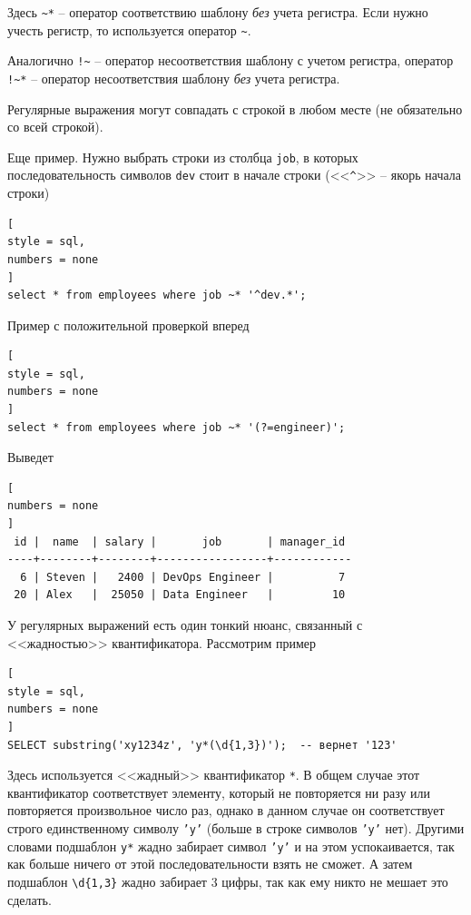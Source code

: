 \documentclass[%
	11pt,
	a4paper,
	utf8,
		]{article}
\begin{document}
Здесь \verb|~*| -- оператор соответствию шаблону \emph{без} учета регистра. Если нужно учесть регистр, то используется оператор \verb|~|.

Аналогично \verb|!~| -- оператор несоответствия шаблону с учетом регистра, оператор \verb|!~*| -- оператор несоответствия шаблону \emph{без} учета регистра.

Регулярные выражения могут совпадать с строкой в любом месте (не обязательно со всей строкой).

Еще пример. Нужно выбрать строки из столбца \texttt{job}, в которых последовательность символов \texttt{dev} стоит в начале строки (<<\verb|^|>> -- якорь начала строки)

\begin{lstlisting}[
style = sql,
numbers = none
]
select * from employees where job ~* '^dev.*';
\end{lstlisting}

Пример с положительной проверкой вперед
\begin{lstlisting}[
style = sql,
numbers = none
]
select * from employees where job ~* '(?=engineer)';
\end{lstlisting}

Выведет
\begin{lstlisting}[
numbers = none
]
 id |  name  | salary |       job       | manager_id
----+--------+--------+-----------------+------------
  6 | Steven |   2400 | DevOps Engineer |          7
 20 | Alex   |  25050 | Data Engineer   |         10
\end{lstlisting}

У регулярных выражений есть один тонкий нюанс, связанный с <<жадностью>> квантификатора. Рассмотрим пример
\begin{lstlisting}[
style = sql,
numbers = none
]
SELECT substring('xy1234z', 'y*(\d{1,3})');  -- вернет '123'
\end{lstlisting}

Здесь используется <<жадный>> квантификатор \texttt{*}. В общем случае этот квантификатор соответствует элементу, который не повторяется ни разу или повторяется произвольное число раз, однако в данном случае он соответствует строго единственному символу \texttt{'y'} (больше в строке символов \texttt{'y'} нет). Другими словами подшаблон \texttt{y*} жадно забирает символ \texttt{'y'} и на этом успокаивается, так как больше ничего от этой последовательности взять не сможет. А затем подшаблон \verb|\d{1,3}| жадно забирает 3 цифры, так как ему никто не мешает это сделать.
\end{document}
